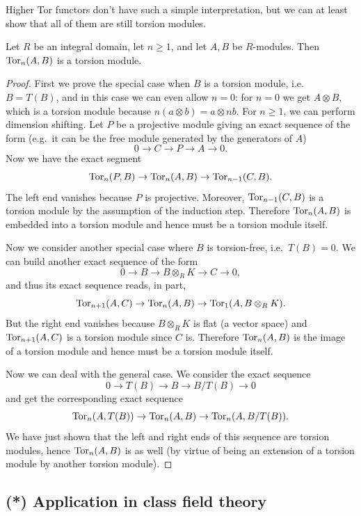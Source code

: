 Higher Tor functors don't have such a simple interpretation, but we can at least show that all of them are still torsion modules.

\begin{thm}
    Let $R$ be an integral domain, let $n\geq 1$, and let $A,B$ be $R$-modules. Then $\operatorname{Tor}_n(A,B)$ is a torsion module.
\end{thm}
\begin{proof}
    First we prove the special case when $B$ is a torsion module, i.e.~ $B=T(B)$, and in this case we can even allow $n=0$: for $n=0$ we get $A\otimes B$, which is a torsion module because $n(a\otimes b)=a\otimes nb$. For $n\geq 1$, we can perform dimension shifting. Let $P$ be a projective module giving an exact sequence of the form (e.g.~it can be the free module generated by the generators of $A$)
    \[0\to C\to P\to A\to 0.\]
    Now we have the exact segment
    \[\operatorname{Tor}_n(P,B)\to \operatorname{Tor}_n(A,B)\to \operatorname{Tor}_{n-1}(C,B).\]
    The left end vanishes because $P$ is projective. Moreover, $\operatorname{Tor}_{n-1}(C,B)$ is a torsion module by the assumption of the induction step. Therefore $\operatorname{Tor}_n(A,B)$ is embedded into a torsion module and hence must be a torsion module itself.

    Now we consider another special case where $B$ is torsion-free, i.e.~$T(B)=0$. We can build another exact sequence of the form
    \[0\to B\to B\otimes_R K\to C\to 0,\]
    and thus its exact sequence reads, in part,
    \[\operatorname{Tor}_{n+1}(A,C)\to \operatorname{Tor}_n(A,B)\to \operatorname{Tor}_1(A,B\otimes_R K).\]
    But the right end vanishes because $B\otimes_R K$ is flat (a vector space) and $\operatorname{Tor}_{n+1}(A,C)$ is a torsion module since $C$ is. Therefore $ \operatorname{Tor}_n(A,B)$ is the image of a torsion module and hence must be a torsion module itself.

    Now we can deal with the general case. We consider the exact sequence
    \[0\to T(B)\to B\to B\slash T(B)\to 0\]
    and get the corresponding exact sequence
    \[\operatorname{Tor}_n(A,T(B))\to \operatorname{Tor}_n(A,B)\to \operatorname{Tor}_n(A,B\slash T(B)).\]
    We have just shown that the left and right ends of this sequence are torsion modules, hence $\operatorname{Tor}_n(A,B)$ is as well (by virtue of being an extension of a torsion module by another torsion module).
\end{proof}




\subsection{(*) Application in class field theory}

